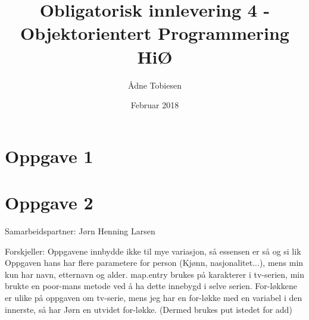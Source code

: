 \documentclass{article}
\title{Obligatorisk innlevering 4 - Objektorientert Programmering HiØ}
\author{Ådne Tobiesen}
\date{Februar 2018}
\begin{document}
   \maketitle
   
   \section*{Oppgave 1}
   
   
   
   \newpage
   \section*{Oppgave 2}
   Samarbeidspartner: Jørn Henning Larsen
   
   Forskjeller:
    Oppgavene innbydde ikke til mye variasjon, så essensen er så og si lik
    Oppgaven hans har flere parametere for person (Kjønn, nasjonalitet...), mens min kun har navn, etternavn og alder.
    map.entry brukes på karakterer i tv-serien, min brukte en poor-mans metode ved å ha dette innebygd i selve serien.
    For-løkkene er ulike på oppgaven om tv-serie, mens jeg har en for-løkke med en variabel i den innerste, så har Jørn en utvidet for-løkke. (Dermed brukes put istedet for add)
  
\end{document}
